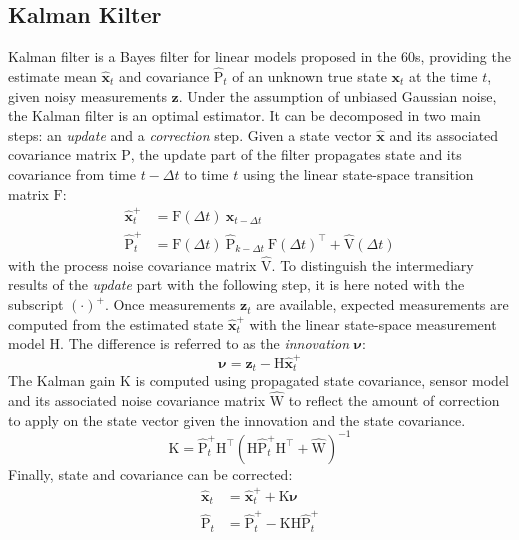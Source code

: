 \subsection{Kalman Kilter}
Kalman filter is a Bayes filter for linear models proposed in the 60s, providing the estimate mean $\hat{\boldsymbol{x}}_t$ and covariance $\hat{\text{P}}_t$ of an unknown true state $\boldsymbol{x}_t$ at the time $t$, given noisy measurements $\boldsymbol{z}$. Under the assumption of unbiased Gaussian noise, the Kalman filter is an optimal estimator. It can be decomposed in two main steps: an \emph{update} and a \emph{correction} step. Given a state vector $\hat{\boldsymbol{x}}$ and its associated covariance matrix $\text{P}$, the update part of the filter propagates state and its covariance from time $t-\Delta t$ to time $t$ using the linear state-space transition matrix $\text{F}$:
\begin{align}
    \hat{\boldsymbol{x}}^{+}_t &= \text{F}(\Delta t) \: \boldsymbol{x}_{t-\Delta t} \label{eq:kalman_linear_update}\\
    \hat{\text{P}}^{+}_t &= \text{F}(\Delta t) \: \hat{\text{P}}_{k-\Delta t} \: \text{F}(\Delta t)^\intercal + \hat{\text{V}}(\Delta t) \label{eq:kalman_linear_update_covariance}
\end{align}
with the process noise covariance matrix $\hat{\text{V}}$. To distinguish the intermediary results of the \emph{update} part with the following step, it is here noted with the subscript $(\cdot)^{+}$. Once measurements $\boldsymbol{z}_{t}$ are available, expected measurements are computed from the estimated state $ \hat{\boldsymbol{x}}^{+}_t $ with the linear state-space measurement model $\text{H}$. The difference is referred to as the \emph{innovation} $\boldsymbol{\nu}$:
\begin{equation} \label{eq:kalman_linear_innovation}
    \boldsymbol{\nu} = \boldsymbol{z}_{t} - \text{H}\hat{\boldsymbol{x}}^{+}_t
\end{equation}
The Kalman gain $\text{K}$ is computed using propagated state covariance, sensor model and its associated noise covariance matrix $\hat{\text{W}}$ to reflect the amount of correction to apply on the state vector given the innovation and the state covariance.
\begin{equation} \label{eq:kalman_linear_gain}
    \text{K} = \hat{\text{P}}^{+}_t \text{H}^\intercal \left( \text{H}\hat{\text{P}}^{+}_t \text{H}^\intercal + \hat{\text{W}} \right)^{-1}
\end{equation}
Finally, state and covariance can be corrected:
\begin{align}
    \hat{\boldsymbol{x}}_t&= \hat{\boldsymbol{x}}^{+}_t + \text{K}\boldsymbol{\nu}  \label{eq:kalman_linear_correct} \\
    \hat{\text{P}}_t &= \hat{\text{P}}^{+}_t - \text{K}\text{H}\hat{\text{P}}^{+}_t  \label{eq:kalman_linear_correct_covariance}
\end{align}

